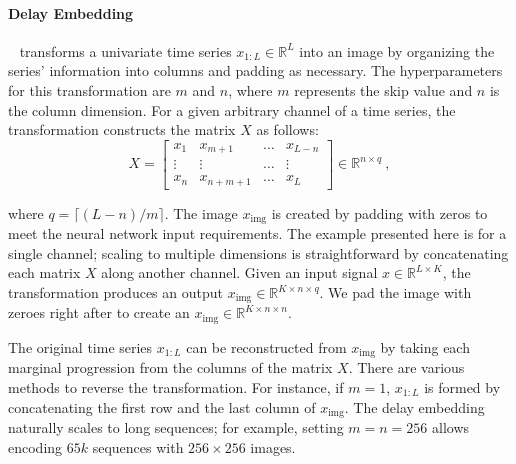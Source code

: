 \documentclass{article}
\begin{document}
\paragraph{Delay Embedding}~\cite{takens2006detecting} transforms a univariate time series $x_{1:L} \in \mathbb{R}^L$ into an image by organizing the series' information into columns and padding as necessary. The hyperparameters for this transformation are $m$ and $n$, where $m$ represents the skip value and $n$ is the column dimension. For a given arbitrary channel of a time series, the transformation constructs the matrix $X$ as follows:
\[
X = \begin{bmatrix}
    x_1 & x_{m+1}  & \dots  & x_{L-n} \\
    \vdots & \vdots & \dots & \vdots \\
    x_n & x_{n+m+1} & \dots & x_L
    \end{bmatrix} \in \mathbb{R}^{n \times q} \ ,
\]

where \( q = \lceil (L-n)/m \rceil \). The image $ x_\text{img} $ is created by padding with zeros to meet the neural network input requirements. The example presented here is for a single channel; scaling to multiple dimensions is straightforward by concatenating each matrix $X$ along another channel. Given an input signal $ x \in \mathbb{R}^{L \times K} $, the transformation produces an output $ x_{\text{img}} \in \mathbb{R}^{K \times n \times q} $. We pad the image with zeroes right after to create an $ x_{\text{img}} \in \mathbb{R}^{K \times n \times n} $.

The original time series $ x_{1:L} $ can be reconstructed from $x_\text{img}$ by taking each marginal progression from the columns of the matrix $X$. There are various methods to reverse the transformation. For instance, if $m=1$, $x_{1:L}$ is formed by concatenating the first row and the last column of $x_\text{img}$. The delay embedding naturally scales to long sequences; for example, setting $m=n=256$ allows encoding $65k$ sequences with $256 \times 256$ images.
\end{document}
